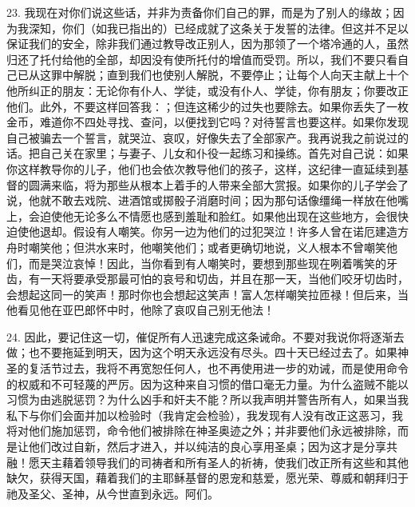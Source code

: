 23. 我现在对你们说这些话，并非为责备你们自己的罪，而是为了别人的缘故；因为我深知，你们（如我已指出的）已经成就了这条关于发誓的法律。但这并不足以保证我们的安全，除非我们通过教导改正别人，因为那领了一个塔冷通的人，虽然归还了托付给他的全部，却因没有使所托付的增值而受罚。所以，我们不要只看自己已从这罪中解脱；直到我们也使别人解脱，不要停止；让每个人向天主献上十个他所纠正的朋友：无论你有仆人、学徒，或没有仆人、学徒，你有朋友；你要改正他们。此外，不要这样回答我：；但连这稀少的过失也要除去。如果你丢失了一枚金币，难道你不四处寻找、查问，以便找到它吗？对待誓言也要这样。如果你发现自己被骗去一个誓言，就哭泣、哀叹，好像失去了全部家产。我再说我之前说过的话。把自己关在家里；与妻子、儿女和仆役一起练习和操练。首先对自己说：如果你这样教导你的儿子，他们也会依次教导他们的孩子，这样，这纪律一直延续到基督的圆满来临，将为那些从根本上着手的人带来全部大赏报。如果你的儿子学会了说，他就不敢去戏院、进酒馆或掷骰子消磨时间；因为那句话像缰绳一样放在他嘴上，会迫使他无论多么不情愿也感到羞耻和脸红。如果他出现在这些地方，会很快迫使他退却。假设有人嘲笑。你另一边为他们的过犯哭泣！许多人曾在诺厄建造方舟时嘲笑他；但洪水来时，他嘲笑他们；或者更确切地说，义人根本不曾嘲笑他们，而是哭泣哀悼！因此，当你看到有人嘲笑时，要想到那些现在咧着嘴笑的牙齿，有一天将要承受那最可怕的哀号和切齿，并且在那一天，当他们咬牙切齿时，会想起这同一的笑声！那时你也会想起这笑声！富人怎样嘲笑拉匝禄！但后来，当他看见他在亚巴郎怀中时，他除了哀叹自己别无他法！\par

24. 因此，要记住这一切，催促所有人迅速完成这条诫命。不要对我说你将逐渐去做；也不要拖延到明天，因为这个明天永远没有尽头。四十天已经过去了。如果神圣的复活节过去，我将不再宽恕任何人，也不再使用进一步的劝诫，而是使用命令的权威和不可轻蔑的严厉。因为这种来自习惯的借口毫无力量。为什么盗贼不能以习惯为由逃脱惩罚？为什么凶手和奸夫不能？所以我声明并警告所有人，如果当我私下与你们会面并加以检验时（我肯定会检验），我发现有人没有改正这恶习，我将对他们施加惩罚，命令他们被排除在神圣奥迹之外；并非要他们永远被排除，而是让他们改过自新，然后才进入，并以纯洁的良心享用圣桌；因为这才是分享共融！愿天主藉着领导我们的司祷者和所有圣人的祈祷，使我们改正所有这些和其他缺欠，获得天国，藉着我们的主耶稣基督的恩宠和慈爱，愿光荣、尊威和朝拜归于祂及圣父、圣神，从今世直到永远。阿们。\par


